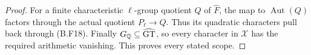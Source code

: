 \begin{proof}
For a finite characteristic $\ell$-group quotient
$Q$ of $\widehat F$, the map to $\operatorname{Aut}(Q)$
factors through the actual quotient $P_\ell\to Q$.
Thus its quadratic characters pull back through
(B.F18). Finally $G_{\mathbb Q}\subseteq\widehat{\mathrm{GT}}$,
so every character in $\mathscr X$ has the required
arithmetic vanishing. This proves every stated scope.
\end{proof}

